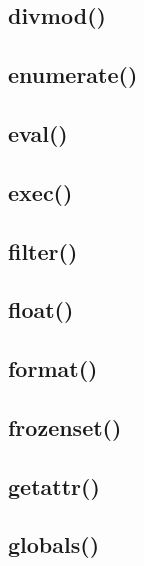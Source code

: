 \documentclass{article}
\begin{document}
\subsection{divmod()}
%

\subsection{enumerate()}
%

\subsection{eval()}
%

\subsection{exec()}
%

\subsection{filter()}
%

\subsection{float()}
%

\subsection{format()}
%

\subsection{frozenset()}
%

\subsection{getattr()}
%

\subsection{globals()}
%
\end{document}
